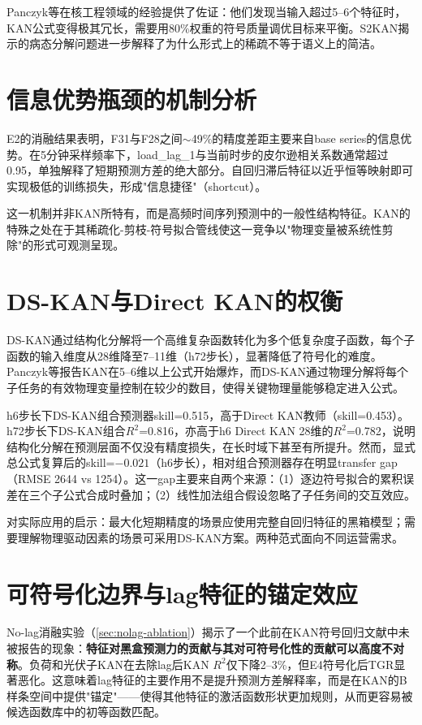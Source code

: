 \documentclass[12pt,a4paper,oneside]{ctexbook}
\begin{document}
Panczyk等\cite{panczyk2025opening}在核工程领域的经验提供了佐证：他们发现当输入超过5--6个特征时，KAN公式变得极其冗长，需要用80\%权重的符号质量调优目标来平衡。S2KAN\cite{bagrow2025s2kan}揭示的病态分解问题进一步解释了为什么形式上的稀疏不等于语义上的简洁。

\section{信息优势瓶颈的机制分析}

E2的消融结果表明，F31与F28之间$\sim$49\%的精度差距主要来自base series的信息优势。在5分钟采样频率下，load\_lag\_1与当前时步的皮尔逊相关系数通常超过0.95，单独解释了短期预测方差的绝大部分。自回归滞后特征以近乎恒等映射即可实现极低的训练损失，形成"信息捷径"（shortcut）。

这一机制并非KAN所特有，而是高频时间序列预测中的一般性结构特征。KAN的特殊之处在于其稀疏化-剪枝-符号拟合管线使这一竞争以"物理变量被系统性剪除"的形式可观测呈现。

\section{DS-KAN与Direct KAN的权衡}

DS-KAN通过结构化分解将一个高维复杂函数转化为多个低复杂度子函数，每个子函数的输入维度从28维降至7--11维（h72步长），显著降低了符号化的难度。Panczyk等\cite{panczyk2025opening}报告KAN在5--6维以上公式开始爆炸，而DS-KAN通过物理分解将每个子任务的有效物理变量控制在较少的数目，使得关键物理量能够稳定进入公式。

h6步长下DS-KAN组合预测器skill=0.515，高于Direct KAN教师（skill=0.453）。h72步长下DS-KAN组合$R^2$=0.816，亦高于h6 Direct KAN 28维的$R^2$=0.782，说明结构化分解在预测层面不仅没有精度损失，在长时域下甚至有所提升。然而，显式总公式复算后的skill=$-0.021$（h6步长），相对组合预测器存在明显transfer gap（RMSE 2644 vs 1254）。这一gap主要来自两个来源：（1）逐边符号拟合的累积误差在三个子公式合成时叠加；（2）线性加法组合假设忽略了子任务间的交互效应。

对实际应用的启示：最大化短期精度的场景应使用完整自回归特征的黑箱模型；需要理解物理驱动因素的场景可采用DS-KAN方案。两种范式面向不同运营需求。

\section{可符号化边界与lag特征的锚定效应}

No-lag消融实验（\cref{sec:nolag-ablation}）揭示了一个此前在KAN符号回归文献中未被报告的现象：\textbf{特征对黑盒预测力的贡献与其对可符号化性的贡献可以高度不对称}。负荷和光伏子KAN在去除lag后KAN $R^2$仅下降2--3\%，但E4符号化后TGR显著恶化。这意味着lag特征的主要作用不是提升预测方差解释率，而是在KAN的B样条空间中提供"锚定"——使得其他特征的激活函数形状更加规则，从而更容易被候选函数库中的初等函数匹配。
\end{document}
